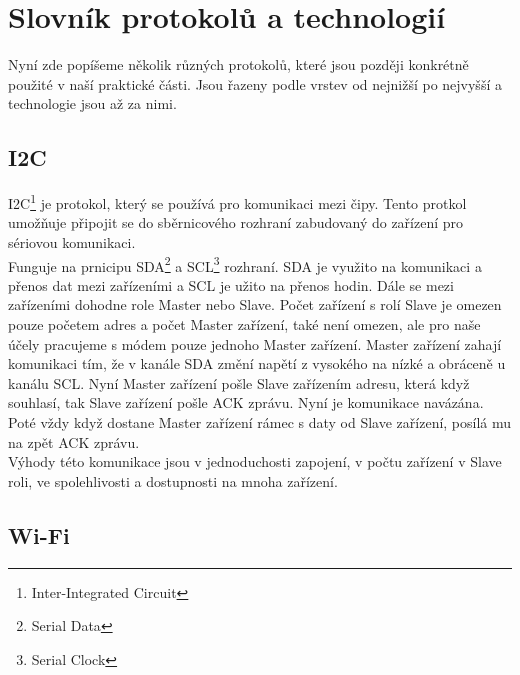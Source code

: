 \documentclass[12pt]{report}			%
\begin{document}
			\section{Slovník protokolů a technologií}
Nyní zde popíšeme několik různých protokolů, které jsou později konkrétně použité v naší praktické části. Jsou řazeny podle vrstev od nejnižší po nejvyšší a technologie jsou až za nimi.
				\subsection{I2C}
I2C\footnote{Inter-Integrated Circuit} je protokol, který se používá pro komunikaci mezi čipy. Tento protkol umožňuje připojit se do sběrnicového rozhraní zabudovaný do zařízení pro sériovou komunikaci. 
\\
Funguje na prnicipu SDA\footnote{Serial Data} a SCL\footnote{Serial Clock} rozhraní. SDA je využito na komunikaci a přenos dat mezi zařízeními a SCL je užito na přenos hodin. Dále se mezi zařízeními dohodne role Master nebo Slave. Počet zařízení s rolí Slave je omezen pouze početem adres a počet Master zařízení, také není omezen, ale pro naše účely pracujeme s módem pouze jednoho Master zařízení. Master zařízení zahají komunikaci tím, že v kanále SDA změní napětí z vysokého na nízké a obráceně u kanálu SCL. Nyní Master zařízení pošle Slave zařízením adresu, která když souhlasí, tak Slave zařízení pošle ACK zprávu. Nyní je komunikace navázána. Poté vždy když dostane Master zařízení rámec s daty od Slave zařízení, posílá mu na zpět ACK zprávu.
\\
Výhody této komunikace jsou v jednoduchosti zapojení, v počtu zařízení v Slave roli, ve spolehlivosti a dostupnosti na mnoha zařízení.  


\cite{i2c_1}
\cite{i2c_2}
\cite{i2c_3}
\cite{i2c_4}
				\subsection{Wi-Fi}
\end{document}
